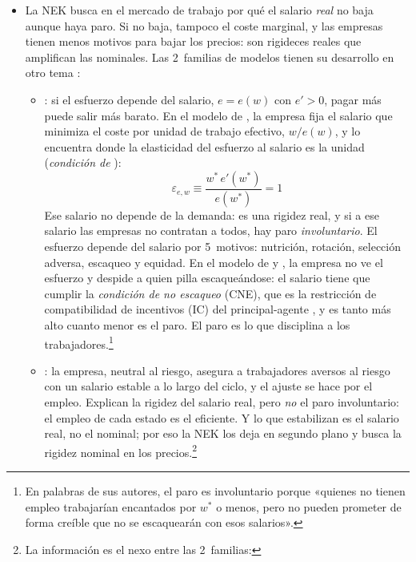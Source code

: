 \documentclass[11pt]{article}
\begin{document}
\begin{itemize}
\item La NEK busca en el mercado de trabajo por qué el salario \emph{real} no baja aunque haya paro. Si no baja, tampoco el coste marginal, y las empresas tienen menos motivos para bajar los precios: son rigideces reales que amplifican las nominales\nocite{BallRomer1990Real}. Las 2~familias de modelos tienen su desarrollo en otro tema :
  \begin{itemize}
  \item {}: si el esfuerzo depende del salario, $e=e(w)$ con $e'>0$, pagar más puede salir más barato. En el modelo de \textcite{Solow1979Another}, la empresa fija el salario que minimiza el coste por unidad de trabajo efectivo, $w/e(w)$, y lo encuentra donde la elasticidad del esfuerzo al salario es la unidad (\emph{condición de }):
    \begin{equation}
    \varepsilon_{e,w}\equiv\frac{w^*\,e'(w^*)}{e(w^*)}=1 \label{eq:condicion-solow}
    \end{equation}
    Ese salario no depende de la demanda: es una rigidez real, y si a ese salario las empresas no contratan a todos, hay paro \emph{involuntario}. El esfuerzo depende del salario por 5~motivos: nutrición\nocite{Leibenstein1957Theory}, rotación\nocite{Salop1979Model}, selección adversa\nocite{Weiss1980Job}, escaqueo\nocite{ShapiroStiglitz1984Equilibrium} y equidad\nocite{Akerlof1982Labor,AkerlofYellen1990Fair}. En el modelo de  y , la empresa no ve el esfuerzo y despide a quien pilla escaqueándose: el salario tiene que cumplir la \emph{condición de no escaqueo} (CNE), que es la restricción de compatibilidad de incentivos (IC) del principal-agente , y es tanto más alto cuanto menor es el paro. El paro es lo que disciplina a los trabajadores.\footnote{En palabras de sus autores, el paro es involuntario porque «quienes no tienen empleo trabajarían encantados por $w^*$ o menos, pero no pueden prometer de forma creíble que no se escaquearán con esos salarios»\nocite{ShapiroStiglitz1984Equilibrium}.}
  \item {}\nocite{Baily1974Wages,Gordon1974Neoclassical,Azariadis1975Implicit}: la empresa, neutral al riesgo, asegura a trabajadores aversos al riesgo con un salario estable a lo largo del ciclo, y el ajuste se hace por el empleo. Explican la rigidez del salario real, pero \emph{no} el paro involuntario: el empleo de cada estado es el eficiente. Y lo que estabilizan es el salario real, no el nominal; por eso la NEK los deja en segundo plano y busca la rigidez nominal en los precios.\footnote{La información es el nexo entre las 2~familias:
}
\end{itemize}
\end{itemize}
\end{document}
